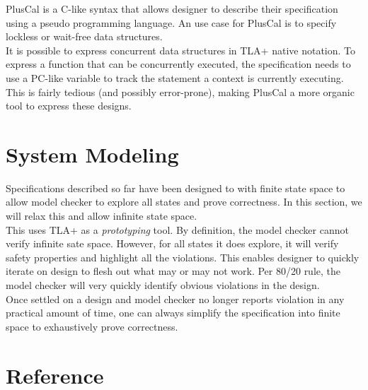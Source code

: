 \documentclass{kdp}
\begin{document}
PlusCal is a C-like syntax that allows designer to describe their specification
using a pseudo programming language. An use case for PlusCal is to specify
lockless or wait-free data structures.\\

It is possible to express concurrent data structures in TLA+ native notation. To
express a function that can be concurrently executed, the specification needs to
use a PC-like variable to track the statement a context is currently executing.
This is fairly tedious (and possibly error-prone), making PlusCal a more organic
tool to express these designs. 





\part{System Modeling}

Specifications described so far have been designed to with finite state space to
allow model checker to explore all states and prove correctness. In this
section, we will relax this and allow infinite state space.\\

This uses TLA+ as a \textit{prototyping} tool. By definition, the model checker
cannot verify infinite sate space. However, for all states it does explore, it
will verify safety properties and highlight all the violations. This enables
designer to quickly iterate on design to flesh out what may or may not work. Per
80/20 rule, the model checker will very quickly identify obvious violations in
the design.\\

Once settled on a design and model checker no longer reports violation in any 
practical amount of time, one can always simplify the specification into finite
space to exhaustively prove correctness. 







\part{Reference}










\end{document}
